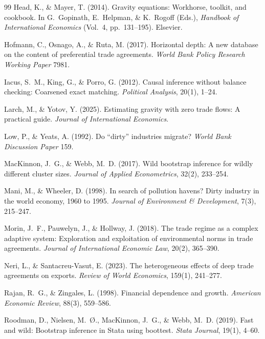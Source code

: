 \documentclass[12pt]{article}
\begin{document}
\begin{thebibliography}{99}
Head, K., \& Mayer, T. (2014).
Gravity equations: Workhorse, toolkit, and cookbook.
In G.~Gopinath, E.~Helpman, \& K.~Rogoff (Eds.), \textit{Handbook of International
Economics} (Vol.\ 4, pp.\ 131--195). Elsevier.

Hofmann, C., Osnago, A., \& Ruta, M. (2017).
Horizontal depth: A new database on the content of preferential trade agreements.
\textit{World Bank Policy Research Working Paper} 7981.

Iacus, S.~M., King, G., \& Porro, G. (2012).
Causal inference without balance checking: Coarsened exact matching.
\textit{Political Analysis}, 20(1), 1--24.

Larch, M., \& Yotov, Y. (2025).
Estimating gravity with zero trade flows: A practical guide.
\textit{Journal of International Economics}.

Low, P., \& Yeats, A. (1992).
Do ``dirty'' industries migrate?
\textit{World Bank Discussion Paper} 159.

MacKinnon, J.~G., \& Webb, M.~D. (2017).
Wild bootstrap inference for wildly different cluster sizes.
\textit{Journal of Applied Econometrics}, 32(2), 233--254.

Mani, M., \& Wheeler, D. (1998).
In search of pollution havens? Dirty industry in the world economy, 1960 to 1995.
\textit{Journal of Environment \& Development}, 7(3), 215--247.

Morin, J.~F., Pauwelyn, J., \& Hollway, J. (2018).
The trade regime as a complex adaptive system: Exploration and exploitation of
environmental norms in trade agreements.
\textit{Journal of International Economic Law}, 20(2), 365--390.

Neri, L., \& Santacreu-Vasut, E. (2023).
The heterogeneous effects of deep trade agreements on exports.
\textit{Review of World Economics}, 159(1), 241--277.

Rajan, R.~G., \& Zingales, L. (1998).
Financial dependence and growth.
\textit{American Economic Review}, 88(3), 559--586.

Roodman, D., Nielsen, M.~Ø., MacKinnon, J.~G., \& Webb, M.~D. (2019).
Fast and wild: Bootstrap inference in Stata using boottest.
\textit{Stata Journal}, 19(1), 4--60.


\end{thebibliography}
\end{document}
